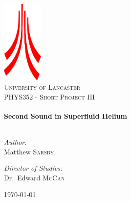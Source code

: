 
\begin{titlepage}

\begin{center}
\hspace{1cm} %
\vspace{4cm}

\includegraphics[width=0.15\textwidth]{./pics/logo}\\[1cm]    

\textsc{\LARGE University of Lancaster}\\[1.5cm]

\textsc{\Large PHYS352 - Short Project III}\\[0.5cm]



\HRule \\[0.4cm]
{ \huge \bfseries Second Sound in Superfluid Helium}\\[0.1cm]

\HRule \\[1.5cm]

\begin{minipage}{0.4\textwidth}
\begin{flushleft} \large
\emph{Author:}\\
Matthew \textsc{Sarsby}
\end{flushleft}
\end{minipage}
\begin{minipage}{0.4\textwidth}
\begin{flushright} \large
\emph{Director of Studies:} \\
Dr.~Edward \textsc{McCan}
\end{flushright}
\end{minipage}

\vfill

{\large \today}

\end{center}

\end{titlepage}

